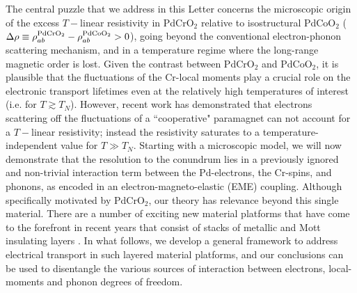 \documentclass[aps,prl,twocolumn,superscriptaddress,amsmath,nofootinbib,10pt,floatfix]{revtex4-2}
\begin{document}
{ The central puzzle that we address in this Letter concerns the microscopic origin of the excess $T-$linear resistivity in PdCrO$_2$ relative to isostructural PdCoO$_2$ ($\Delta \rho \equiv \rho_{ab}^{\rm PdCrO_2} -\rho_{ab}^{\rm PdCoO_2}>0$), going beyond the conventional electron-phonon scattering mechanism, and in a temperature regime where the long-range magnetic order is lost. Given the contrast between PdCrO$_2$ and PdCoO$_2$, it is plausible that the fluctuations of the Cr-local moments play a crucial role on the electronic transport lifetimes even at the relatively high temperatures of interest (i.e. for $T\gtrsim T_N$). However, recent work \cite{mcroberts2022intermediatescale} has demonstrated that electrons scattering off the fluctuations of a ``cooperative" paramagnet \cite{Keren_1994,Moessner_1998L,Moessner_1998B,conlon,Anjana_2017,Mourigal_2019,Shu_2019,Knolle_2022T} can not account for a $T-$linear resistivity; instead the resistivity saturates to a temperature-independent value for $T\gg T_N$. Starting with a microscopic model, we will now demonstrate that the resolution to the conundrum lies in a previously ignored and non-trivial interaction term between the Pd-electrons, the Cr-spins, and phonons, as encoded in an electron-magneto-elastic (EME) coupling. Although specifically motivated by PdCrO$_2$, our theory has relevance beyond this single material. There are a number of exciting new material platforms that have come to the forefront in recent years that consist of stacks of metallic and Mott insulating layers \cite{moirerev,Mak2022,FaiMIT,pasupathyMIT,ajesh,ruhman,moireHF,vavno2021artificial,persky2022magnetic}. In what follows, we develop a general framework to address electrical transport in such layered material platforms, and our conclusions can be used to disentangle the various sources of interaction between electrons, local-moments and phonon degrees of freedom. 
 
}
\end{document}
